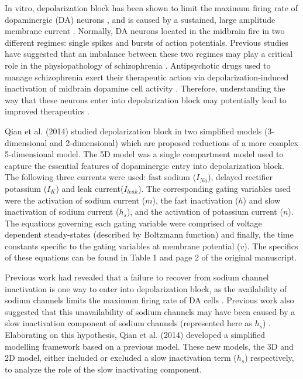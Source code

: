 \newcommand{\colorhref}[2]{\href{#1}{\color{blue}{#2}}}

In vitro, depolarization block has been shown to limit the maximum firing rate of dopaminergic (DA) neurons \cite{Richards1997}, and is caused by a sustained, large amplitude membrane current \cite{Bianchi2012}. Normally, DA neurons located in the midbrain fire in two different regimes: single spikes and bursts of action potentials. Previous studies have suggested that an imbalance between these two regimes may play a critical role in the physiopathology of schizophrenia \cite{Benamer2018}. Antipsychotic drugs used to manage schizophrenia exert their therapeutic action via depolarization-induced inactivation of midbrain dopamine cell activity \cite{Grace1997}. Therefore, understanding the way that these neurons enter into depolarization block may potentially lead to improved therapeutics \cite{Qian2014}.

Qian et al. (2014) studied depolarization block in two simplified models (3-dimensional and 2-dimensional) which are proposed reductions of a more complex 5-dimensional model. The 5D model was a single compartment model used to capture the essential features of dopaminergic entry into depolarization block. The following three currents were used: fast sodium ($I_{Na}$), delayed rectifier potassium ($I_{K}$) and leak current($I_{leak}$). The corresponding gating variables used were the activation of sodium current ($m$), the fast inactivation ($h$) and slow inactivation of sodium current ($h_s$), and the activation of potassium current ($n$). The equations governing each gating variable were comprised of voltage dependent steady-states (described by Boltzmann function) and finally, the time constants specific to the gating variables at membrane potential ($v$). The specifics of these equations can be found in Table 1 and page 2 of the original manuscript. 

Previous work had revealed that a failure to recover from sodium channel inactivation is one way to enter into depolarization block, as the availability of sodium channels limits the maximum firing rate of DA cells \cite{Qian2014, Deister2009,Kuznetsova2010}. Previous work also suggested that this unavailability of sodium channels may have been caused by a slow inactivation component of sodium channels (represented here as $h_s$) \cite{Ding2011}. Elaborating on this hypothesis, Qian et al. (2014) developed a simplified modelling framework based on a previous model. These new models, the 3D and 2D model, either included or excluded a slow inactivation term ($h_s$) respectively, to analyze the role of the slow inactivating component.

